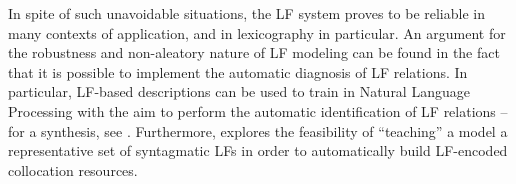 In spite of such unavoidable situations, the LF system proves to be reliable in many contexts of application, and in lexicography in particular. An argument for the robustness and non-aleatory nature of LF modeling can be found in the fact that it is possible to implement the automatic diagnosis of LF relations. In particular, LF-based descriptions can be used to train  in Natural Language Processing with the aim to perform the automatic identification of LF relations -- for a synthesis, see \textcite{Wanner2022}. Furthermore, \textcite{FisasWanner2026} explores the feasibility of ``teaching'' a  model a representative set of syntagmatic LFs in order to automatically build LF-encoded collocation resources. 

\clearpage{\pagestyle{empty}\cleardoublepage}

